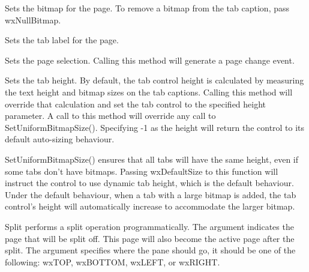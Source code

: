 
Sets the bitmap for the page.  To remove a bitmap from the tab caption, pass
wxNullBitmap.

\label{wxauinotebooksetpagetext}


Sets the tab label for the page.

\label{wxauinotebooksetselection}


Sets the page selection.  Calling this method will generate a page change event.

\label{wxauinotebooksettabctrlheight}


Sets the tab height.  By default, the tab control height is calculated
by measuring the text height and bitmap sizes on the tab captions.  Calling this
method will override that calculation and set the tab control to the specified
height parameter.  A call to this method will override any call to SetUniformBitmapSize().
Specifying -1 as the height will return the control to its default auto-sizing behaviour.

\label{wxauinotebooksetuniformbitmapsize}


SetUniformBitmapSize() ensures that all tabs will have the same height, even
if some tabs don't have bitmaps.  Passing wxDefaultSize to this function will
instruct the control to use dynamic tab height, which is the default behaviour.
Under the default behaviour, when a tab with a large bitmap is added, the tab control's
height will automatically increase to accommodate the larger bitmap.


Split performs a split operation programmatically. The argument  indicates
the page that will be split off.  This page will also become the active page after the
split.  The  argument specifies where the pane should go, it should be one
of the following: wxTOP, wxBOTTOM, wxLEFT, or wxRIGHT.





